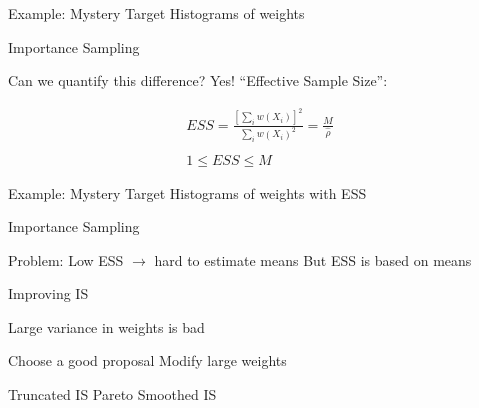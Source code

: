 \documentclass[14pt]{beamer}
\newcommand{\bE}{\mathbb{E}}
\begin{document}
\begin{frame}{Example: Mystery Target}
    Histograms of weights
\end{frame}

\begin{frame}{Importance Sampling}
    \begin{outline}
        \1 Can we quantify this difference?
            \2 Yes!
        \1 ``Effective Sample Size'':
    \end{outline}
    \begin{gather*}
        ESS = \frac{\left[\sum_i w(X_i)\right]^2}{\sum_i w(X_i)^2} = \frac{M}{\hat{\rho}}\\ \\
        1 \leq ESS \leq M
    \end{gather*}
\end{frame}

\begin{frame}{Example: Mystery Target}
    Histograms of weights with ESS
\end{frame}

\begin{frame}{Importance Sampling}
    \begin{outline}
        \1 Problem: Low ESS $\rightarrow$ hard to estimate means \newline
        \1 But ESS is based on means
            \2 \citep{Cha18}
    \end{outline}
\end{frame}




\begin{frame}{Improving IS}
    \begin{outline}
        \1 Large variance in weights is bad \newline

        \1 Choose a good proposal
        \1 Modify large weights \newline
        
        \1 Truncated IS
        \1 Pareto Smoothed IS
    \end{outline}
\end{frame}
\end{document}
